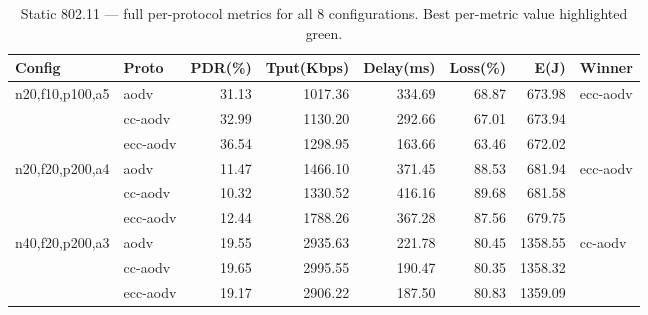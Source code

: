 \documentclass[11pt,a4paper]{article}
\begin{document}
\begin{table}[h]
\centering
\caption{Static 802.11 — full per-protocol metrics for all $8$ configurations.
Best per-metric value highlighted green.}
\label{tab:results-static}
\scriptsize
\setlength{\tabcolsep}{4pt}
\begin{tabular}{l l r r r r r l}
\toprule
\textbf{Config} & \textbf{Proto} & \textbf{PDR(\%)} & \textbf{Tput(Kbps)} & \textbf{Delay(ms)} & \textbf{Loss(\%)} & \textbf{E(J)} & \textbf{Winner} \\
\midrule
\multirow{3}{*}{n20,f10,p100,a5}
 & aodv     & 31.13                       & 1017.36                       & 334.69                       & 68.87                       & 673.98                       & \multirow{3}{*}{ecc-aodv} \\
 & cc-aodv  & 32.99                       & 1130.20                       & 292.66                       & 67.01                       & 673.94                       & \\
 & ecc-aodv & \cellcolor{lightgreen}36.54 & \cellcolor{lightgreen}1298.95 & \cellcolor{lightgreen}163.66 & \cellcolor{lightgreen}63.46 & \cellcolor{lightgreen}672.02 & \\
\midrule
\multirow{3}{*}{n20,f20,p200,a4}
 & aodv     & 11.47                       & 1466.10                       & 371.45                       & 88.53                       & 681.94                       & \multirow{3}{*}{ecc-aodv} \\
 & cc-aodv  & 10.32                       & 1330.52                       & 416.16                       & 89.68                       & 681.58                       & \\
 & ecc-aodv & \cellcolor{lightgreen}12.44 & \cellcolor{lightgreen}1788.26 & \cellcolor{lightgreen}367.28 & \cellcolor{lightgreen}87.56 & \cellcolor{lightgreen}679.75 & \\
\midrule
\multirow{3}{*}{n40,f20,p200,a3}
 & aodv     & 19.55                       & 2935.63                       & 221.78                       & 80.45                       & 1358.55                       & \multirow{3}{*}{cc-aodv} \\
 & cc-aodv  & \cellcolor{lightgreen}19.65 & \cellcolor{lightgreen}2995.55 & 190.47                       & \cellcolor{lightgreen}80.35 & \cellcolor{lightgreen}1358.32 & \\
 & ecc-aodv & 19.17                       & 2906.22                       & \cellcolor{lightgreen}187.50 & 80.83                       & 1359.09                       & \\

\end{tabular}
\end{table}
\end{document}
